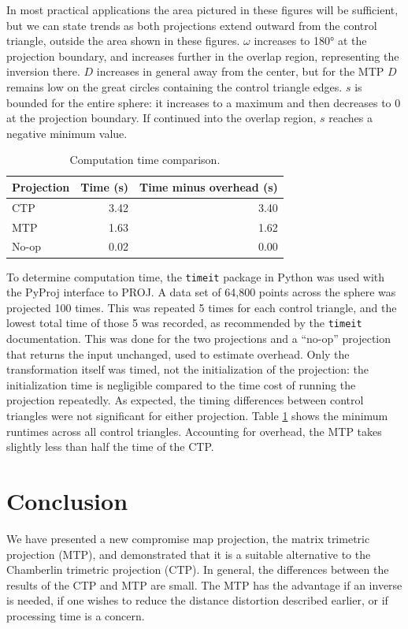 \documentclass[]{interact}
\begin{document}
In most practical applications the area pictured in these figures will be
sufficient, but we can state trends as both projections extend outward from the
control triangle, outside the area shown in these figures. $\omega$ increases to
180° at the projection boundary, and increases further in the overlap region,
representing the inversion there. $D$ increases in general away from the center,
but for the MTP $D$ remains low on the great circles
containing the control triangle edges. $s$ is bounded for the entire sphere: it
increases to a maximum and then decreases to 0 at the projection boundary. If
continued into the overlap region, $s$ reaches a negative minimum value.

\begin{table}
\begin{tabular}{ l r r}
  Projection & Time (s) & Time minus overhead (s)\\
\hline
  CTP & 3.42 & 3.40 \\
  MTP & 1.63 & 1.62 \\
  No-op & 0.02 & 0.00
\end{tabular}
\caption{Computation time comparison.}
\label{table:time}
\end{table}

To determine computation time, the \texttt{timeit} package in Python
\citep{python} was used with the PyProj interface to PROJ. \citep{pyproj} A
data set of 64,800 points across the sphere was projected 100 times. This was
repeated 5 times for each control triangle, and the lowest total time of those 5
was recorded, as recommended by the \texttt{timeit} documentation. This was
done for the two projections and a ``no-op'' projection that returns the input
unchanged, used to estimate overhead. Only the transformation itself was timed,
not the initialization of the projection: the initialization time is negligible
compared to the time cost of running the projection repeatedly. As expected,
the timing differences between control triangles were not significant for either
projection. Table \ref{table:time} shows the minimum
runtimes across all control triangles. Accounting for overhead,
the MTP takes slightly less than half the time of the CTP.

\section{Conclusion}
We have presented a new compromise map projection, the matrix trimetric
projection (MTP), and demonstrated that it is a suitable alternative to the
Chamberlin trimetric projection (CTP). In general, the differences between the
results of the CTP and MTP are small. The MTP has the advantage if an inverse
is needed, if one wishes to reduce the distance distortion described earlier,
or if processing time is a concern.
\end{document}
